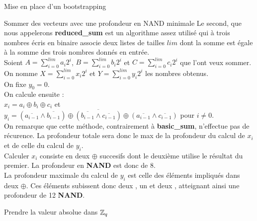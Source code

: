 \begin{section}{Mise en place d'un bootstrapping}
\begin{subsection}{Sommer des vecteurs avec une profondeur en NAND minimale}
Le second, que nous appelerons \textbf{reduced\_sum} est un algorithme assez utilisé qui à trois nombres écris en binaire associe deux listes de tailles $lim$ dont la somme est égale à la somme des trois nombres donnés en entrée. \\
Soient $A = \sum\limits_{i=0}^{lim} a_i 2^i$, $B = \sum\limits_{i=0}^{lim} b_i 2^i$ et $C = \sum\limits_{i=0}^{lim} c_i 2^i$ que l'ont veux sommer. \\
On nomme $X = \sum\limits_{i=0}^{lim} x_i 2^i$  et $Y = \sum\limits_{i=0}^{lim} y_i 2^i$ les nombres obtenus. \\
On fixe $y_0 = 0$. \\
On calcule ensuite : \\
$x_i = a_i \oplus b_i \oplus c_i$ et \\
$y_i = \overline{(\overline{a_{i-1}} \land \overline{b_{i-1}}) \oplus (\overline{b_{i-1}} \land \overline{c_{i-1}}) \oplus (\overline{a_{i-1}} \land \overline{c_{i-1}})}$ pour $i \neq 0$. \\
On remarque que cette méthode, contrairement à \textbf{basic\_sum}, n'effectue pas de récurence. La profondeur totale sera donc le max de la profondeur du calcul de $x_i$ et de celle du calcul de $y_i$. \\
Calculer $x_i$ consiste en deux $\oplus$ succesifs dont le deuxième utilise le résultat du premier. La profondeur en \textbf{NAND} est donc de 8. \\
La profondeur maximale du calcul de $y_i$ est celle des éléments impliqués dans deux $\oplus$. Ces éléments subissent donc deux , un  et deux , atteignant ainsi une profondeur de 12 \textbf{NAND}.

\end{subsection}
\begin{subsection}{Prendre la valeur absolue dans $\mathbb{Z}_q$}
\end{subsection}
\end{section}
